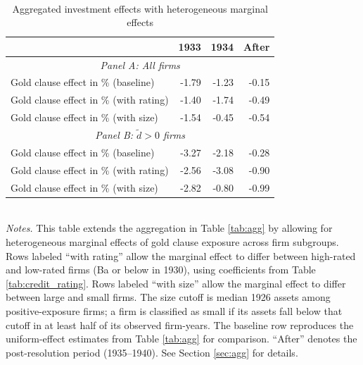 \begin{table}[p]\centering
    \caption{\\Aggregated investment effects with heterogeneous marginal effects}\footnotesize
    \label{tabapp:agg_het}
    \begin{tabular}{lrrr}
    \toprule
    & 1933 & 1934 & After \\
    \midrule
    \multicolumn{4}{c}{\textit{Panel A: All firms}}\\
    \midrule
    Gold clause effect in \% (baseline)      & -1.79 & -1.23 & -0.15 \\
    Gold clause effect in \% (with rating)      & -1.40 & -1.74 & -0.49 \\
    Gold clause effect in \% (with size)      & -1.54 & -0.45 & -0.54 \\
    \midrule
    \multicolumn{4}{c}{\textit{Panel B: $\tilde{d}>0$ firms}}\\
    \midrule
    Gold clause effect in \% (baseline)      & -3.27 & -2.18 & -0.28 \\
    Gold clause effect in \% (with rating)      & -2.56 & -3.08 & -0.90 \\
    Gold clause effect in \% (with size)      & -2.82 & -0.80 & -0.99 \\
    \bottomrule

    \end{tabular}\\

    \vspace*{3mm} \justifying \noindent
\footnotesize{\textit{Notes.} This table extends the aggregation in Table \ref{tab:agg} by allowing for heterogeneous marginal effects of gold clause exposure across firm subgroups. Rows labeled ``with rating'' allow the marginal effect to differ between high-rated and low-rated firms (Ba or below in 1930), using coefficients from Table \ref{tab:credit_rating}. Rows labeled ``with size'' allow the marginal effect to differ between large and small firms. The size cutoff is median 1926 assets among positive-exposure firms; a firm is classified as small if its assets fall below that cutoff in at least half of its observed firm-years. The baseline row reproduces the uniform-effect estimates from Table \ref{tab:agg} for comparison. ``After'' denotes the post-resolution period (1935--1940). See Section \ref{sec:agg} for details.}
\end{table}